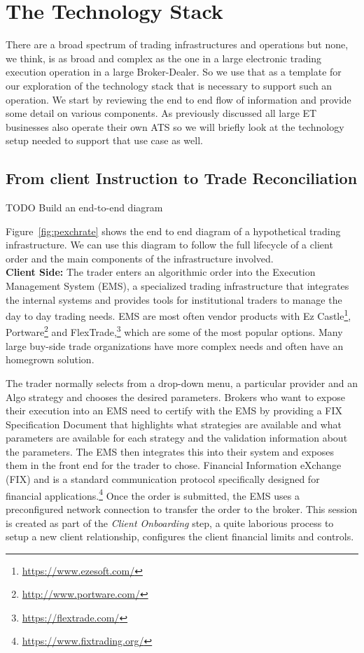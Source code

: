 \chapter{The Technology Stack\label{chap:ch_tech}}

There are a broad spectrum of trading infrastructures and operations but none, we think, is as broad and complex as the one in a large electronic trading execution operation in a large Broker-Dealer. So we use that as a template for our exploration of the technology stack that is necessary to support such an operation. We start by reviewing the end to end flow of information and provide some detail on various components. As previously discussed all large ET businesses also operate their own ATS so we will briefly look at the technology setup needed to support that use case as well.


\section{From client Instruction to Trade Reconciliation}

TODO Build an end-to-end diagram


Figure~\ref{fig:pexchrate} shows the end to end diagram of a hypothetical trading infrastructure. We can use this diagram to follow the full lifecycle of a client order and the main components of the infrastructure involved. \\


\noindent\textbf{Client Side:} The trader enters an algorithmic order into the Execution Management System (EMS), a specialized trading infrastructure that integrates the internal systems and provides tools for institutional traders to manage the day to day trading needs. EMS are most often vendor products with Ez Castle\footnote{\url{https://www.ezesoft.com/}}, Portware\footnote{\url{http://www.portware.com/}} and FlexTrade,\footnote{\url{https://flextrade.com/}} which are some of the most popular options. Many large buy-side trade organizations have more complex needs and often have an homegrown solution.


The trader normally selects from a drop-down menu, a particular provider and an Algo strategy and  chooses the desired parameters. Brokers who want to expose their execution into an EMS need to certify with the EMS by providing a FIX Specification Document that highlights what strategies are available and what parameters are available for each strategy and the validation information about the parameters. The EMS then integrates this into their system and exposes them in the front end for the trader to chose. Financial Information eXchange (FIX) and is a standard communication protocol specifically designed for financial applications.\footnote{\url{https://www.fixtrading.org/}} Once the order is submitted, the EMS uses a preconfigured network connection to transfer the order to the broker. This session is created as part of the \emph{Client Onboarding} step, a quite laborious process to setup a new client relationship, configures the client financial limits and controls. \\


